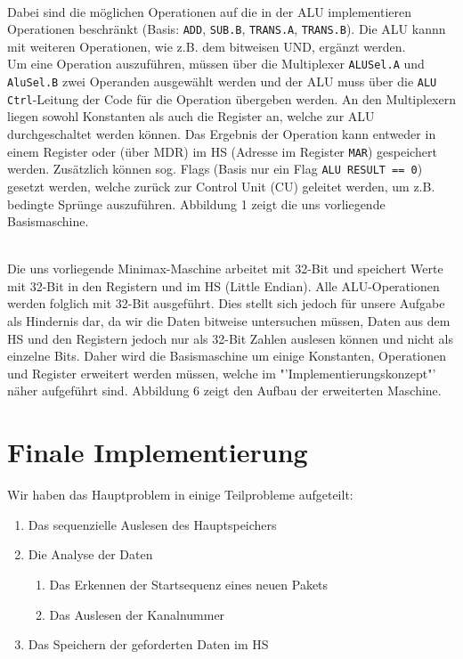 \documentclass[12pt,titlepage]{article}
\begin{document}
\leavevmode \\
Dabei sind die m{\"o}glichen Operationen auf die in der ALU implementieren
Operationen beschr{\"a}nkt (Basis: \texttt{ADD}, \texttt{SUB.B}, \texttt{TRANS.A}, \texttt{TRANS.B}). Die ALU kannn mit weiteren Operationen,
wie z.B. dem bitweisen UND, erg{\"a}nzt werden.\\
Um eine Operation auszuf{\"u}hren, m{\"u}ssen {\"u}ber die Multiplexer \texttt{ALUSel.A} und \texttt{AluSel.B} zwei Operanden ausgew{\"a}hlt werden
und der ALU muss {\"u}ber die \texttt{ALU Ctrl}-Leitung der Code f{\"u}r die Operation {\"u}bergeben werden. An den Multiplexern liegen sowohl
Konstanten als auch die Register an, welche zur ALU durchgeschaltet werden k{\"o}nnen. Das Ergebnis der Operation kann
entweder in einem Register oder (über MDR) im HS (Adresse im Register \texttt{MAR}) gespeichert werden. Zus{\"a}tzlich k{\"o}nnen sog. Flags (Basis nur ein Flag \texttt{ALU RESULT == 0})
gesetzt werden, welche zur{\"u}ck zur Control Unit (CU) geleitet werden, um z.B. bedingte Spr{\"u}nge auszuf{\"u}hren.
Abbildung 1 zeigt die uns vorliegende Basismaschine.

\leavevmode \\
Die uns vorliegende Minimax-Maschine arbeitet mit 32-Bit und speichert Werte mit 32-Bit in den Registern und im HS (\dq Little Endian\dq ).
Alle ALU-Operationen werden folglich mit 32-Bit ausgef{\"u}hrt. Dies stellt sich jedoch f{\"u}r unsere Aufgabe als
Hindernis dar, da wir die Daten bitweise untersuchen m{\"u}ssen, Daten aus dem HS und den Registern jedoch nur als
32-Bit Zahlen auslesen k{\"o}nnen und nicht als einzelne Bits.
Daher wird die Basismaschine um einige Konstanten, Operationen und Register erweitert werden müssen, welche im "'Implementierungskonzept"' n{\"a}her
aufgeführt sind. Abbildung 6 zeigt den Aufbau der erweiterten Maschine.

\newpage

\section{Finale Implementierung}
Wir haben das Hauptproblem in einige Teilprobleme aufgeteilt:
\begin{enumerate}
\item Das sequenzielle Auslesen des Hauptspeichers
\item Die Analyse der Daten
    \begin{enumerate}
    \item Das Erkennen der Startsequenz eines neuen Pakets
    \item Das Auslesen der Kanalnummer
    \end{enumerate}
\item Das Speichern der geforderten Daten im HS
\end{enumerate}
\end{document}
